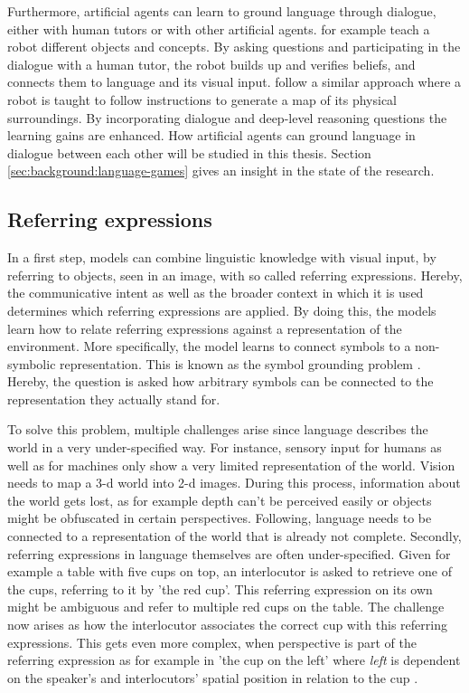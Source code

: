 Furthermore, artificial agents can learn to ground language through dialogue, either with human tutors or with other artificial agents.
\citet{Skocaj2011} for example teach a robot different objects and concepts.
By asking questions and participating in the dialogue with a human tutor, the robot builds up and verifies beliefs, and connects them to language and its visual input.
\citet{Lauria2001} follow a similar approach where a robot is taught to follow instructions to generate a map of its physical surroundings.
By incorporating dialogue and deep-level reasoning questions the learning gains are enhanced.
How artificial agents can ground language in dialogue between each other will be studied in this thesis.
Section \ref{sec:background:language-games} gives an insight in the state of the research.


\subsection{Referring expressions}


In a first step, models can combine linguistic knowledge with visual input, by referring to objects, seen in an image, with so called referring expressions.
Hereby, the communicative intent as well as the broader context in which it is used determines which referring expressions are applied.
By doing this, the models learn how to relate referring expressions against a representation of the environment.
More specifically, the model learns to connect symbols to a non-symbolic representation.
This is known as the symbol grounding problem \citep{Harnad1990,Roy2002}.
Hereby, the question is asked how arbitrary symbols can be connected to the representation they actually stand for.

To solve this problem, multiple challenges arise since language describes the world in a very under-specified way.
For instance, sensory input for humans as well as for machines only show a very limited representation of the world.
Vision needs to map a 3-d world into 2-d images.
During this process, information about the world gets lost, as for example depth can't be perceived easily or objects might be obfuscated in certain perspectives.
Following, language needs to be connected to a representation of the world that is already not complete.
Secondly, referring expressions in language themselves are often under-specified.
Given for example a table with five cups on top, an interlocutor is asked to retrieve one of the cups, referring to it by 'the red cup'.
This referring expression on its own might be ambiguous and refer to multiple red cups on the table.
The challenge now arises as how the interlocutor associates the correct cup with this referring expressions.
This gets even more complex, when perspective is part of the referring expression as for example in 'the cup on the left' where \emph{left} is dependent on the speaker's and interlocutors' spatial position in relation to the cup \citep{Dobnik2021}.

